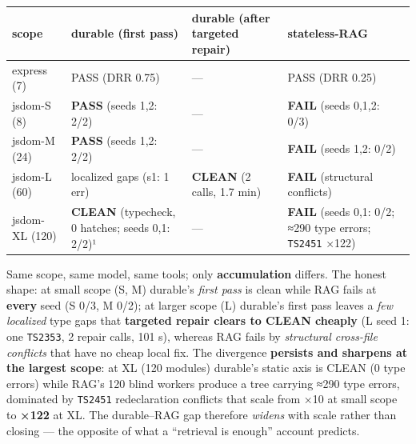 \documentclass[
  10pt,
]{article}
\newcounter{none} %
\begin{document}
{\def\LTcaptype{none} %
\begin{longtable}[]{@{}
  >{\raggedright\arraybackslash}p{}
  >{\raggedright\arraybackslash}p{}
  >{\raggedright\arraybackslash}p{}
  >{\raggedright\arraybackslash}p{}@{}}
\toprule\noalign{}
\begin{minipage}[b]{\linewidth}\raggedright
scope
\end{minipage} & \begin{minipage}[b]{\linewidth}\raggedright
durable (first pass)
\end{minipage} & \begin{minipage}[b]{\linewidth}\raggedright
durable (after targeted repair)
\end{minipage} & \begin{minipage}[b]{\linewidth}\raggedright
stateless-RAG
\end{minipage} \\
\midrule\noalign{}
\endhead
\bottomrule\noalign{}
\endlastfoot
express (7) & PASS (DRR 0.75) & --- & PASS (DRR 0.25) \\
jsdom-S (8) & \textbf{PASS} (seeds 1,2: 2/2) & --- & \textbf{FAIL}
(seeds 0,1,2: 0/3) \\
jsdom-M (24) & \textbf{PASS} (seeds 1,2: 2/2) & --- & \textbf{FAIL}
(seeds 1,2: 0/2) \\
jsdom-L (60) & localized gaps (s1: 1 err) & \textbf{CLEAN} (2 calls, 1.7
min) & \textbf{FAIL} (structural conflicts) \\
jsdom-XL (120) & \textbf{CLEAN} (typecheck, 0 hatches; seeds 0,1: 2/2)¹
& --- & \textbf{FAIL} (seeds 0,1: 0/2; ≈290 type errors; \texttt{TS2451}
×122) \\
\end{longtable}
}

Same scope, same model, same tools; only \textbf{accumulation} differs.
The honest shape: at small scope (S, M) durable's \emph{first pass} is
clean while RAG fails at \textbf{every} seed (S 0/3, M 0/2); at larger
scope (L) durable's first pass leaves a \emph{few localized} type gaps
that \textbf{targeted repair clears to CLEAN cheaply} (L seed 1: one
\texttt{TS2353}, 2 repair calls, 101 s), whereas RAG fails by
\emph{structural cross-file conflicts} that have no cheap local fix. The
divergence \textbf{persists and sharpens at the largest scope}: at XL
(120 modules) durable's static axis is CLEAN (0 type errors) while RAG's
120 blind workers produce a tree carrying ≈290 type errors, dominated by
\texttt{TS2451} redeclaration conflicts that scale from ×10 at small
scope to \textbf{×122} at XL. The durable--RAG gap therefore
\emph{widens} with scale rather than closing --- the opposite of what a
``retrieval is enough'' account predicts.
\end{document}
